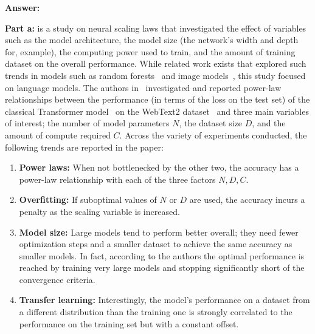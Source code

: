 {\bf Answer:}

{\bf Part a:} \citep{kaplan2020scaling} is a study on neural scaling laws that investigated the effect of variables such as the model architecture, the model size (the network's width and depth for, example), the computing power used to train, and the amount of training dataset on the overall performance. While related work exists that explored such trends in models such as random forests~\citep{biau2012analysis} and image models~\citep{tan2019efficientnet}, this study focused on language models. The authors in~\citep{kaplan2020scaling} investigated and reported power-law relationships between the performance (in terms of the loss on the test set) of the classical Transformer model~\citep{vaswani2017attention} on the WebText2 dataset~\citep{radford2019language} and three main variables of interest; the number of model parameters $N$, the dataset size $D$, and the amount of compute required $C$. Across the variety of experiments conducted, the following trends are reported in the paper:
\begin{enumerate}
\item {\bf Power laws:} When not bottlenecked by the other two, the accuracy has a power-law relationship with each of the three factors $N, D, C$.
\item {\bf Overfitting:} If suboptimal values of $N$ or $D$ are used, the accuracy incurs a penalty as the scaling variable is increased.
\item {\bf Model size:} Large models tend to perform better overall; they need fewer optimization steps and a smaller dataset to achieve the same accuracy as smaller models. In fact, according to the authors the optimal performance is reached by training very large models and stopping significantly short of the convergence criteria.
\item {\bf Transfer learning:} Interestingly, the model's performance on a dataset from a different distribution than the training one is strongly correlated to the performance on the training set but with a constant offset.
\end{enumerate}
%
